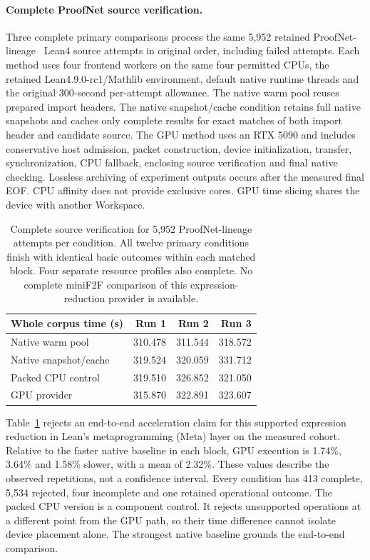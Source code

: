 \documentclass[10pt,twocolumn]{article}
\begin{document}
\paragraph{Complete ProofNet source verification.}
Three complete primary comparisons process the same 5,952 retained
ProofNet-lineage~\cite{proofnetSource,goedelProofnet} Lean4 source attempts in original order, including failed
attempts. Each method uses four frontend workers on the same four permitted
CPUs, the retained Lean4.9.0-rc1/Mathlib environment, default native runtime
threads and the original 300-second per-attempt allowance.
The native warm pool reuses prepared import headers. The native snapshot/cache
condition retains full native snapshots and caches only complete results for
exact matches of both import header and candidate source. The GPU method
uses an RTX 5090 and includes conservative host admission, packet construction,
device initialization, transfer, synchronization, CPU fallback, enclosing
source verification and final native checking. Lossless archiving of experiment outputs occurs after the measured final EOF. CPU affinity does not provide
exclusive cores. GPU time slicing shares the device with another Workspace.

\begin{table}[t]
\centering
\small
\begin{tabular}{lrrr}
\toprule
Whole corpus time (s) & Run 1 & Run 2 & Run 3 \\
\midrule
Native warm pool & 310.478 & 311.544 & 318.572 \\
Native snapshot/cache & 319.524 & 320.059 & 331.712 \\
Packed CPU control & 319.510 & 326.852 & 321.050 \\
GPU provider & 315.870 & 322.891 & 323.607 \\
\bottomrule
\end{tabular}
\caption{Complete source verification for 5,952 ProofNet-lineage attempts
per condition. All twelve primary conditions finish with identical basic
outcomes within each matched block. Four separate resource profiles also
complete. No complete miniF2F comparison of this expression-reduction provider
is available.}
\label{tab:current-proofnet-gpu}
\end{table}

Table~\ref{tab:current-proofnet-gpu} rejects an end-to-end acceleration claim
for this supported expression reduction in Lean's metaprogramming (Meta) layer on the measured cohort.
Relative to the faster native baseline in each block, GPU execution is
1.74\%, 3.64\% and 1.58\% slower, with a mean of 2.32\%.
These values describe the observed repetitions, not a confidence interval. Every condition has 413 complete, 5,534 rejected,
four incomplete and one retained operational outcome.
The packed CPU version is a component control. It rejects unsupported
operations at a different point from the GPU path, so their time difference
cannot isolate device placement alone. The strongest native baseline grounds the
end-to-end comparison.
\end{document}
